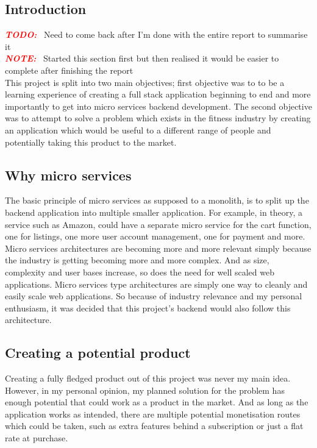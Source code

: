 \documentclass{article}
\newcommand{\vspaceconst}{-2ex}
\newcommand{\TODO}{\textbf{\textit{\textcolor{red}{TODO:}}} }
\newcommand{\NOTE}{\textbf{\textit{\textcolor{red}{NOTE:}}} }
\begin{document}
\begin{multicols}{2}
\section{Introduction}
\vspace{\vspaceconst}

\TODO~Need to come back after I'm done with the entire report to summarise it\\
\NOTE~Started this section first but then realised it would be easier to complete after finishing the report\\

This project is split into two main objectives; first objective was to to be a learning experience of creating a full stack application beginning to end and more importantly to get into micro services backend development. The second objective was to attempt to solve a problem which exists in the fitness industry by creating an application which would be useful to a different range of people and potentially taking this product to the market.


\subsection{Why micro services}
\vspace{\vspaceconst}

The basic principle of micro services as supposed to a monolith, is to split up the backend application into multiple smaller application. For example, in theory, a service such as Amazon, could have a separate micro service for the cart function, one for listings, one more user account management, one for payment and more.
Micro services architectures are becoming more and more relevant simply because the industry is getting becoming more and more complex. And as size, complexity and user bases increase, so does the need for well scaled web applications. Micro services type architectures are simply one way to cleanly and easily scale web applications. So because of industry relevance and my personal enthusiasm, it was decided that this project's backend would also follow this architecture. 

\subsection{Creating a potential product}
\vspace{\vspaceconst}

Creating a fully fledged product out of this project was never my main idea. However, in my personal opinion, my planned solution for the problem has enough potential that could work as a product in the market. And as long as the application works as intended, there are multiple potential monetisation routes which could be taken, such as extra features behind a subscription or just a flat rate at purchase.


\end{multicols}
\end{document}
